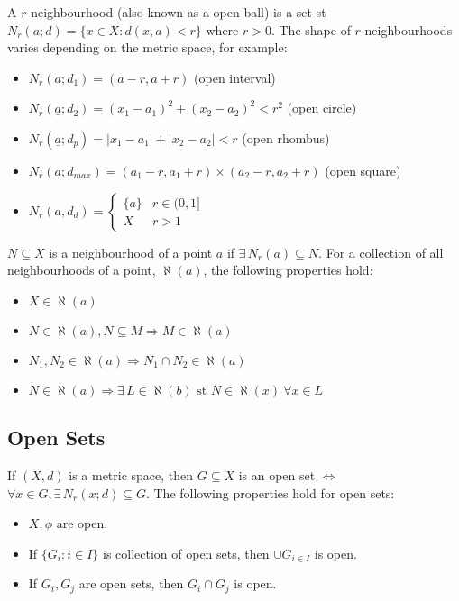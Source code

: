 \documentclass{article}
\begin{document}
A $r$-neighbourhood (also known as a open ball) is a set st $N_r(a;d) = \{x \in X: d(x,a) < r\}$ where $r > 0$. The shape of $r$-neighbourhoods varies depending on the metric space, for example: 
\begin{itemize}
	\item $N_r(a;d_1) = (a-r, a+r)$ (open interval)
	\item $N_r(\underline{a};d_2) = (x_1-a_1)^2 + (x_2 - a_2)^2 < r^2$ (open circle)
	\item $N_r(\underline{a};d_p) = |x_1-a_1| + |x_2-a_2| < r$ (open rhombus)
	\item $N_r(\underline{a};d_{max}) = (a_1-r, a_1+r) \times (a_2-r, a_2+r)$ (open square)
	\item $N_r(a, d_d) = \begin{cases} \{a\} & r \in (0,1] \\ X & r > 1 \end{cases}$
\end{itemize}

$N \subseteq X$ is a neighbourhood of a point $a$ if $\exists \, N_r(a) \subseteq N$. For a collection of all neighbourhoods of a point, $\aleph(a)$, the following properties hold:
\begin{itemize}
	\item $X \in \aleph(a)$
	\item $N \in \aleph(a), N \subseteq M \Rightarrow M \in \aleph(a)$
	\item $N_1, N_2 \in \aleph(a) \Rightarrow N_1 \cap N_2 \in \aleph(a)$
	\item $N \in \aleph(a) \Rightarrow \exists \, L \in \aleph(b) \text{ st } N \in \aleph(x) \: \forall x \in L$
\end{itemize}

\subsection{Open Sets}

If $(X,d)$ is a metric space, then $G \subseteq X$ is an open set $\iff$ $\forall x \in G, \exists \, N_r(x;d) \subseteq G$. The following properties hold for open sets:
\begin{itemize}
	\item $X, \phi$ are open.
	\item If $\{G_i: i \in I\}$ is collection of open sets, then $\cup G_{i \in I}$ is open.
	\item If $G_i,  G_j$ are open sets, then $G_i \cap G_j$ is open.
\end{itemize}
\end{document}
